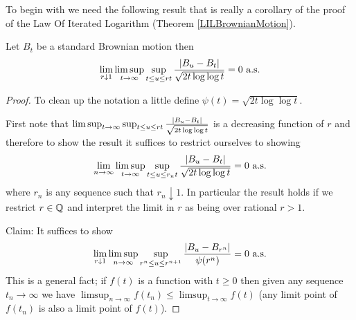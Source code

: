 To begin with we need the following result that is really a corollary
of the proof of the Law Of Iterated Logarithm (Theorem \ref{LILBrownianMotion}).
\begin{lem}\label{RateOfContinuityBrownianMotion}Let $B_t$ be a standard Brownian motion then
\begin{align*}
\lim_{r \downarrow 1} \limsup_{t \to \infty} \sup_{t \leq u \leq rt}
\frac{\left \vert B_u - B_t \right \vert}{\sqrt{2t \log \log t}} = 0 \text{ a.s.}
\end{align*}
\end{lem}
\begin{proof}
To clean up the notation a little define $\psi(t) = \sqrt{2t\log\log
  t}$.

First note that $\limsup_{t \to \infty} \sup_{t \leq u \leq rt}
\frac{\left \vert B_u - B_t \right \vert}{\sqrt{2t \log \log t}}$ is a decreasing
function of $r$ and therefore to show the result it suffices to
restrict ourselves to showing 
\begin{align*}
\lim_{n \to \infty} \limsup_{t \to \infty} \sup_{t \leq u \leq r_n t}
\frac{\left \vert B_u - B_t \right \vert}{\sqrt{2t \log \log t}} = 0 \text{ a.s.}
\end{align*}
where $r_n$ is any sequence such that $r_n \downarrow 1$.  In
particular the result holds if we restrict $r \in \mathbb{Q}$ and
interpret the limit in $r$ as being over rational $r > 1$.

Claim: It suffices to show 
\begin{align*}
\lim_{r \downarrow 1} \limsup_{n \to
  \infty} \sup_{r^n \leq u \leq r^{n+1}} \frac{\left \vert B_u - B_{r^n} \right \vert}{\psi(r^n)} = 0 \text{ a.s.}
\end{align*}
This is a general fact; if $f(t)$ is a function with $t \geq 0$ then
given any sequence $t_n \to \infty$ we have $\limsup_{n \to \infty}
f(t_n) \leq \limsup_{t \to \infty} f(t)$ (any limit point of $f(t_n)$
is also a limit point of $f(t)$).


\end{proof}
